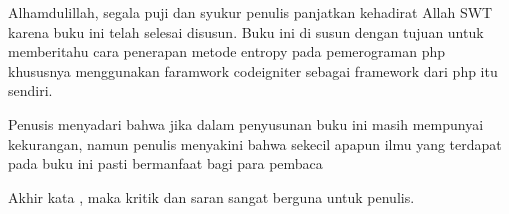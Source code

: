 Alhamdulillah, segala puji dan syukur penulis panjatkan kehadirat Allah SWT karena buku ini telah selesai disusun. Buku ini di susun dengan tujuan untuk memberitahu cara penerapan metode entropy pada pemerograman php khususnya menggunakan faramwork codeigniter sebagai framework dari php itu sendiri.\par

Penusis menyadari bahwa jika dalam penyusunan buku ini masih mempunyai kekurangan, namun penulis menyakini bahwa sekecil apapun ilmu yang terdapat pada buku ini pasti bermanfaat bagi para pembaca\par


Akhir kata , maka kritik dan saran sangat berguna untuk penulis.

